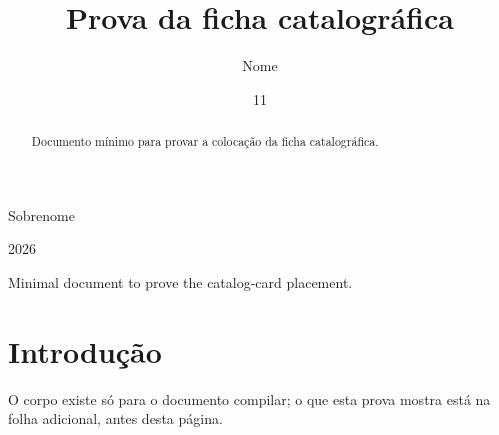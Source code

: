 \documentclass[dsc]{ufrj}
\begin{document}
  \title{Prova da ficha catalográfica}
  \author{Nome}{Sobrenome}
  \date{11}{2026}
  \maketitle
  \frontmatter
  \begin{abstract}
  Documento mínimo para provar a colocação da ficha catalográfica.
  \end{abstract}
  \begin{foreignabstract}
  Minimal document to prove the catalog-card placement.
  \end{foreignabstract}
  \tableofcontents
  \mainmatter
  \chapter{Introdução}
  O corpo existe só para o documento compilar; o que esta prova mostra está na
  folha adicional, antes desta página.
\end{document}
